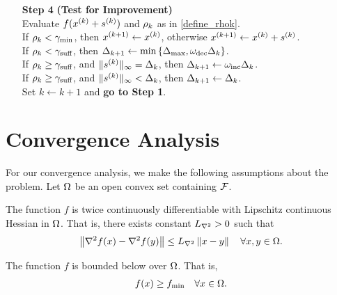 \documentclass{article}
\begin{document}
{\begin{fullwidth}[leftmargin=0in, rightmargin=0in, width=\linewidth-0.5in]
\begin{flushleft}
\begin{algorithm}[H]
\begin{itemize}
 		
        \item[\textbf{Step 4}] \textbf{(Test for Improvement)} \\
            Evaluate $f(x^{(k)} + {{s}^{(k)}})$ and $\rho_k$ as in \cref{define_rhok}. \\
		   If $\rho_k < \gamma_{\textrm{min}}$, then ${{x}^{(k+1)}} \gets x^{(k)}$, otherwise ${{x}^{(k+1)}} \gets x^{(k)} + {{s}^{(k)}}$. \\
            If $\rho_k < \gamma_{\textrm{suff}}$, then $\Delta_{k+1} \gets \min\left\{{\Delta_{\textrm{max}}}, \omega_{\text{dec}}\Delta_k\right\}$. \\
            If $\rho_k \ge \gamma_{\textrm{suff}}$, and $\|{{s}^{(k)}}\|_{\infty} = \Delta_k$, then $\Delta_{k+1} \gets \omega_{\text{inc}}\Delta_k$. \\
            If $\rho_k \ge \gamma_{\textrm{suff}}$, and $\|{{s}^{(k)}}\|_{\infty} < \Delta_k$, then $\Delta_{k+1} \gets \Delta_k$. \\
            Set $k \gets k+1$ and {\bf go to Step 1}.
    \end{itemize}
\end{algorithm}

\end{flushleft}
\end{fullwidth}
}
 
 
\section{Convergence Analysis}
\label{linear_convergence_discussion} 

For our convergence analysis, we make the following assumptions about the problem.
Let $\Omega$ be an open convex set containing ${\mathcal F}$.   

\begin{assumption}
\label{for_fully_quadratic}
\label{lipschitz_hessian}
The function $f$ is twice continuously differentiable with Lipschitz continuous Hessian in $\Omega$.   That is, there exists constant ${L_{\nabla^2}} > 0$ such that 
\begin{align}
\left\|\nabla^2 f(x) - \nabla^2 f(y)\right\| \le {L_{\nabla^2}} \left\|x - y\right\| \quad \forall x, y \in \Omega.
\end{align}
\end{assumption}




\begin{assumption}
\label{lower_bound}
The function $f$ is bounded below over $\Omega$.
That is,
\begin{align}
f(x) \ge f_{\text{min}} \quad \forall x \in \Omega.
\end{align}
\end{assumption}
\end{document}
